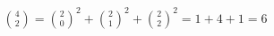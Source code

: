 \documentclass[preview]{standalone}
\begin{document}
\begin{align*}
\binom{4}{2} = \binom{2}{0}^2 + \binom{2}{1}^2 + \binom{2}{2}^2 = 1 + 4 + 1 = 6
\end{align*}
\end{document}

